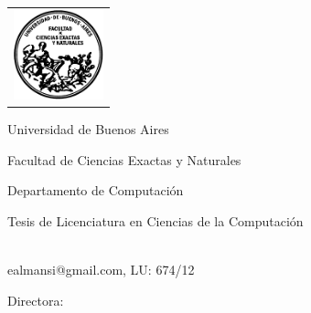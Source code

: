 \newcommand{\HRule}{\rule{\linewidth}{0.2mm}}
%
\thispagestyle{empty}

\begin{center}\leavevmode

\vspace{-2cm}

\begin{tabular}{l}
\includegraphics[width=2.6cm]{logofcen.pdf}
\end{tabular}


{\large \sc Universidad de Buenos Aires

Facultad de Ciencias Exactas y Naturales

Departamento de Computaci\'on}

\vspace{3.0cm}



\begin{huge}
\textbf{\tituloTesis}
\end{huge}

\vspace{2cm}

{\large Tesis de Licenciatura en Ciencias de la Computaci\'on}

\vspace{1cm}

{
  \Large \autor \\
  \small ealmansi@gmail.com, LU: 674/12
}

\end{center}

\vfill

{\large

{Directora: \director}

\vspace{.2cm}

\lugar
}

\newpage\thispagestyle{empty}
